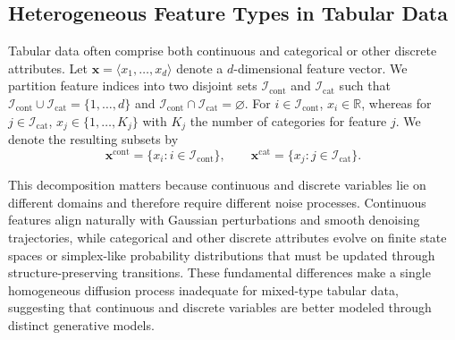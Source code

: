 \documentclass[times, review, 10pt]{elsarticle}
\begin{document}
\subsection{Heterogeneous Feature Types in Tabular Data}

Tabular data often comprise both continuous and categorical or other discrete attributes. Let $\mathbf{x} = \langle x_1, \ldots, x_d \rangle$ denote a $d$-dimensional feature vector. We partition feature indices into two disjoint sets $\mathcal{I}_{\mathrm{cont}}$ and $\mathcal{I}_{\mathrm{cat}}$ such that $\mathcal{I}_{\mathrm{cont}} \cup \mathcal{I}_{\mathrm{cat}} = \{1,\ldots,d\}$ and $\mathcal{I}_{\mathrm{cont}} \cap \mathcal{I}_{\mathrm{cat}} = \varnothing$. For $i \in \mathcal{I}_{\mathrm{cont}}$, $x_i \in \mathbb{R}$, whereas for $j \in \mathcal{I}_{\mathrm{cat}}$, $x_j \in \{1, \ldots, K_j\}$ with $K_j$ the number of categories for feature $j$. We denote the resulting subsets by
\[
\mathbf{x}^{\mathrm{cont}} = \{x_i : i \in \mathcal{I}_{\mathrm{cont}}\},
\qquad
\mathbf{x}^{\mathrm{cat}} = \{x_j : j \in \mathcal{I}_{\mathrm{cat}}\}.
\]

This decomposition matters because continuous and discrete variables lie on
different domains and therefore require different noise processes.
Continuous features align naturally with Gaussian perturbations and smooth
denoising trajectories, while categorical and other discrete attributes
evolve on finite state spaces or simplex-like probability distributions that
must be updated through structure-preserving transitions. These fundamental
differences make a single homogeneous diffusion process inadequate for
mixed-type tabular data, suggesting that continuous and discrete variables
are better modeled through distinct generative models.




\end{document}
